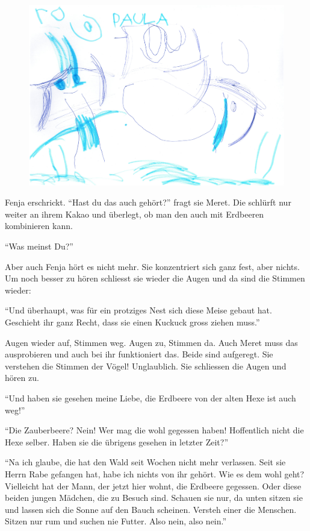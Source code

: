 \begin{figure}[hb]
\centering
\includegraphics[width=\textwidth]{bilder/opa2.pdf}
\end{figure}

Fenja erschrickt. \enquote{Hast du das auch gehört?} fragt sie Meret. Die schlürft nur weiter an ihrem Kakao und überlegt, ob man den auch mit Erdbeeren kombinieren kann.

\enquote{Was meinst Du?}

Aber auch Fenja hört es nicht mehr. Sie konzentriert sich ganz fest, aber nichts. Um noch besser zu hören schliesst sie wieder die Augen und da sind die Stimmen wieder:

\enquote{Und überhaupt, was für ein protziges Nest sich diese Meise gebaut hat. Geschieht ihr ganz Recht, dass sie einen Kuckuck gross ziehen muss.}  

Augen wieder auf, Stimmen weg. Augen zu, Stimmen da. Auch Meret muss das ausprobieren und auch bei ihr funktioniert das. Beide sind aufgeregt. Sie verstehen die Stimmen der Vögel! Unglaublich. Sie schliessen die Augen und hören zu.

\enquote{Und haben sie gesehen meine Liebe, die Erdbeere von der alten Hexe ist auch weg!}

\enquote{Die Zauberbeere? Nein! Wer mag die wohl gegessen haben! Hoffentlich nicht die Hexe selber. Haben sie die übrigens gesehen in letzter Zeit?}

\enquote{Na ich glaube, die hat den Wald seit Wochen nicht mehr verlassen. Seit sie Herrn Rabe gefangen hat, habe ich nichts von ihr gehört. Wie es dem wohl geht? Vielleicht hat der Mann, der jetzt hier wohnt, die Erdbeere gegessen. Oder diese beiden jungen Mädchen, die zu Besuch sind. Schauen sie nur, da unten sitzen sie und lassen sich die Sonne auf den Bauch scheinen. Versteh einer die Menschen. Sitzen nur rum und suchen nie Futter. Also nein, also nein.}

